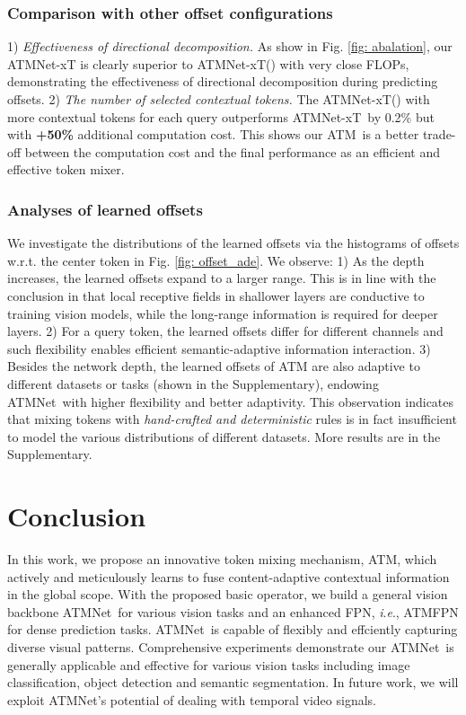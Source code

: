 \documentclass[letterpaper]{article} \usepackage{aaai23v}  \usepackage{times}  \usepackage{helvet}  \usepackage{courier}  \usepackage[hyphens]{url}  \usepackage{graphicx} \urlstyle{rm} \def\UrlFont{\rm}  \usepackage{caption} \frenchspacing  \setlength{\pdfpagewidth}{8.5in}  \setlength{\pdfpageheight}{11in}  \usepackage{algorithm}
\newcommand{\ieno}{\textit{i}.\textit{e}.}
\newcommand{\ours}{{ATMNet}}
\newcommand{\ourcore}{{ATM}}
\newcommand{\ourop}{{ATM}}
\newcommand{\oursxt}{ATMNet-xT}
\begin{document}
\subsubsection{Comparison with other offset configurations} 1) \textit{Effectiveness of directional decomposition.} As show in Fig. \ref{fig: abalation}, our \ours-xT is clearly superior to \ours-xT(\textcolor{magenta}{}) with very close FLOPs, demonstrating the effectiveness of directional decomposition during predicting offsets. 2) \textit{The number of selected contextual tokens.} The \ours-xT(\textcolor{ForestGreen}{}) with more contextual tokens for each query outperforms \oursxt~by 0.2\% but with \textbf{+50\%} additional computation cost. This shows our \ourop~is a better trade-off between the computation cost and the final performance as an efficient and effective token mixer.










\subsubsection{Analyses of learned offsets}
We investigate the distributions of the learned offsets via the histograms of offsets w.r.t. the center token in Fig. \ref{fig: offset_ade}.
We observe: 1) As the depth increases, the learned offsets expand to a larger range. 
This is in line with the conclusion in \cite{raghu2021DoVisionTrans,zhang2021morphmlp} that local receptive fields in shallower layers are conductive to training vision models, while the long-range information is required for deeper layers. 
2) For a query token, the learned offsets differ for different channels and such flexibility enables efficient semantic-adaptive information interaction.
3) Besides the network depth, the learned offsets of ATM are also adaptive to different datasets or tasks (shown in the Supplementary), endowing \ours~with higher flexibility and better adaptivity. This observation indicates that mixing tokens with \textit{hand-crafted and deterministic} rules is in fact insufficient to model the various distributions of different datasets. 
More results are in the Supplementary.



\section{Conclusion}
In this work, we propose an innovative token mixing mechanism, \ourcore, which actively and meticulously learns to fuse content-adaptive contextual information in the global scope. With the proposed basic operator, we build a general vision backbone \ours~for various vision tasks and an enhanced FPN, \ieno, ATMFPN for dense prediction tasks. \ours~is capable of flexibly and effciently capturing diverse visual patterns. Comprehensive experiments demonstrate our \ours~is generally applicable and effective for various vision tasks including image classification, object detection and semantic segmentation. 
In future work, we will exploit \ours's potential of dealing with temporal video signals.
\end{document}
